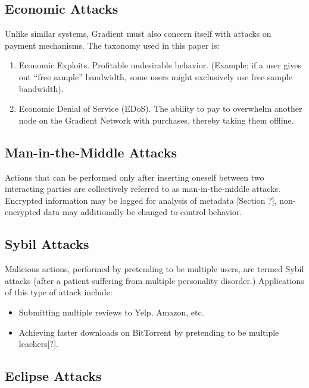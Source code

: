 \documentclass{article}
\begin{document}
\subsection{Economic Attacks}
\label{econ-attacks}

Unlike similar systems, Gradient must also concern itself with attacks on payment mechanisms. The taxonomy used in this paper is:

\begin{enumerate}
    \item Economic Exploits. Profitable undesirable behavior. (Example: if a user gives out “free sample” bandwidth, some users might exclusively use free sample bandwidth).
    \item Economic Denial of Service (EDoS). The ability to pay to overwhelm another node on the Gradient Network with purchases, thereby taking them offline.
\end{enumerate}

\subsection{Man-in-the-Middle Attacks}
\label{mitm}

Actions that can be performed only after inserting oneself between two interacting parties are collectively referred to as man-in-the-middle attacks. Encrypted information may be logged for analysis of metadata [Section ?], non-encrypted data may additionally be changed to control behavior.

\subsection{Sybil Attacks}

Malicious actions, performed by pretending to be multiple users, are termed Sybil attacks (after a patient suffering from multiple personality disorder.) Applications of this type of attack include:

\begin{itemize}
    \item Submitting multiple reviews to Yelp, Amazon, etc.
    \item Achieving faster downloads on BitTorrent by pretending to be multiple leachers[?].
\end{itemize}

\subsection{Eclipse Attacks}
\end{document}

